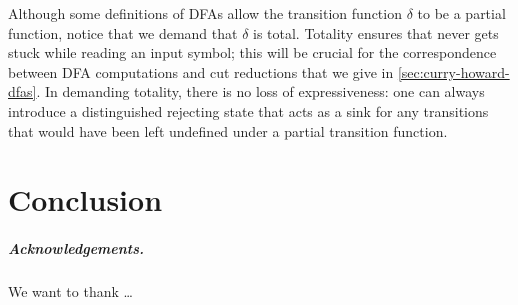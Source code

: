 \documentclass[a4paper,USenglish]{lipics-v2016}
\begin{document}
Although some definitions of \acp{DFA} allow the transition function $\delta$ to be a partial function, notice that we demand that $\delta$ is total.
Totality ensures that  never gets stuck while reading an input symbol;
this will be crucial for the correspondence between \ac{DFA} computations and cut reductions that we give in \cref{sec:curry-howard-dfas}.
In demanding totality, there is no loss of expressiveness: one can always introduce a distinguished rejecting state that acts as a sink for any transitions that would have been left undefined under a partial transition function.


\section{Conclusion}\label{sec:conclusion}

\subparagraph*{Acknowledgements.}

We want to thank \dots




\end{document}
